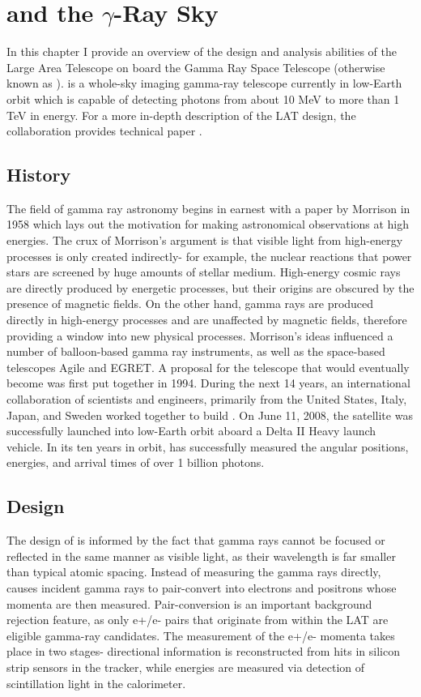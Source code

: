 \chapter[\FermiLAT and the $\gamma$-Ray Sky]{\FermiLAT and the $\gamma$-Ray Sky}
In this chapter I provide an overview of the design and analysis abilities of the Large Area Telescope on board the \Fermi Gamma Ray Space Telescope (otherwise known as \FermiLAT). \FermiLAT is a whole-sky imaging gamma-ray telescope currently in low-Earth orbit which is capable of detecting photons from about 10 MeV to more than 1 TeV in energy. For a more in-depth description of the LAT design, the \FermiLAT collaboration provides technical paper \cite{collaboration_large_2009}. 

\section{History}
The field of gamma ray astronomy begins in earnest with a paper by Morrison in 1958 \cite{morrison_gamma-ray_1958} which lays out the motivation for making astronomical observations at high energies. The crux of Morrison's argument is that visible light from high-energy processes is only created indirectly- for example, the nuclear reactions that power stars are screened by huge amounts of stellar medium. High-energy cosmic rays are directly produced by energetic processes, but their origins are obscured by the presence of magnetic fields. On the other hand, gamma rays are produced directly in high-energy processes and are unaffected by magnetic fields, therefore providing a window into new physical processes. 
Morrison's ideas influenced a number of balloon-based gamma ray instruments, as well as the space-based telescopes Agile and EGRET. A proposal for the telescope that would eventually become \Fermi was first put together in 1994. During the next 14 years, an international collaboration of scientists and engineers, primarily from the United States, Italy, Japan, and Sweden worked together to build \Fermi. On June 11, 2008, the \Fermi satellite was successfully launched into low-Earth orbit aboard a Delta II Heavy launch vehicle. In its ten years in orbit, \Fermi has successfully measured the angular positions, energies, and arrival times of over 1 billion photons. 

\section{Design}
The design of \FermiLAT is informed by the fact that gamma rays cannot be focused or reflected in the same manner as visible light, as their wavelength is far smaller than typical atomic spacing. Instead of measuring the gamma rays directly, \FermiLAT causes incident gamma rays to pair-convert into electrons and positrons whose momenta are then measured. Pair-conversion is an important background rejection feature, as only e+/e- pairs that originate from within the LAT are eligible gamma-ray candidates. The measurement of the e+/e- momenta takes place in two stages- directional information is reconstructed from hits in silicon strip sensors in the tracker, while energies are measured via detection of scintillation light in the calorimeter.

